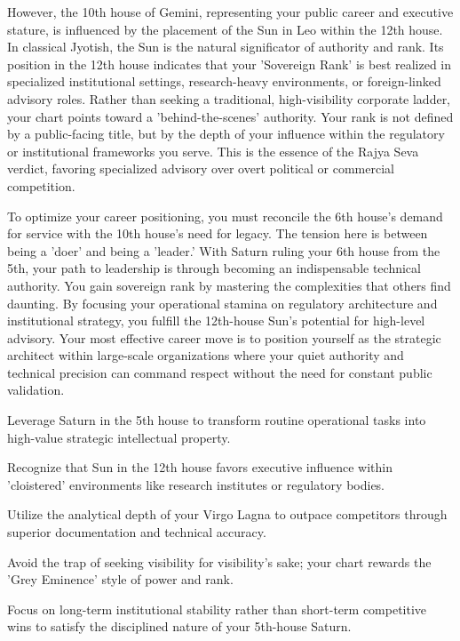 {\fontsize{9}{13}\selectfont However, the 10th house of Gemini, representing your public career and executive stature, is influenced by the placement of the Sun in Leo within the 12th house. In classical Jyotish, the Sun is the natural significator of authority and rank. Its position in the 12th house indicates that your 'Sovereign Rank' is best realized in specialized institutional settings, research-heavy environments, or foreign-linked advisory roles. Rather than seeking a traditional, high-visibility corporate ladder, your chart points toward a 'behind-the-scenes' authority. Your rank is not defined by a public-facing title, but by the depth of your influence within the regulatory or institutional frameworks you serve. This is the essence of the Rajya Seva verdict, favoring specialized advisory over overt political or commercial competition.}\par\vspace{1.8mm}

{\fontsize{9}{13}\selectfont To optimize your career positioning, you must reconcile the 6th house's demand for service with the 10th house's need for legacy. The tension here is between being a 'doer' and being a 'leader.' With Saturn ruling your 6th house from the 5th, your path to leadership is through becoming an indispensable technical authority. You gain sovereign rank by mastering the complexities that others find daunting. By focusing your operational stamina on regulatory architecture and institutional strategy, you fulfill the 12th-house Sun's potential for high-level advisory. Your most effective career move is to position yourself as the strategic architect within large-scale organizations where your quiet authority and technical precision can command respect without the need for constant public validation.}\par\vspace{1.8mm}

\begin{diamondlist}
  \item {\fontsize{8.5}{12}\selectfont Leverage Saturn in the 5th house to transform routine operational tasks into high-value strategic intellectual property.}
  \item {\fontsize{8.5}{12}\selectfont Recognize that Sun in the 12th house favors executive influence within 'cloistered' environments like research institutes or regulatory bodies.}
  \item {\fontsize{8.5}{12}\selectfont Utilize the analytical depth of your Virgo Lagna to outpace competitors through superior documentation and technical accuracy.}
  \item {\fontsize{8.5}{12}\selectfont Avoid the trap of seeking visibility for visibility's sake; your chart rewards the 'Grey Eminence' style of power and rank.}
  \item {\fontsize{8.5}{12}\selectfont Focus on long-term institutional stability rather than short-term competitive wins to satisfy the disciplined nature of your 5th-house Saturn.}
\end{diamondlist}

